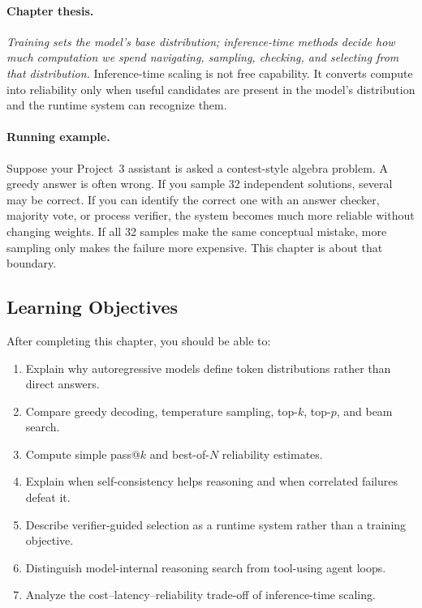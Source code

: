 \paragraph{Chapter thesis.} \emph{Training sets the model's base distribution; inference-time methods decide how much computation we spend navigating, sampling, checking, and selecting from that distribution.} Inference-time scaling is not free capability. It converts compute into reliability only when useful candidates are present in the model's distribution and the runtime system can recognize them.

\paragraph{Running example.} Suppose your Project~3 assistant is asked a contest-style algebra problem. A greedy answer is often wrong. If you sample 32 independent solutions, several may be correct. If you can identify the correct one with an answer checker, majority vote, or process verifier, the system becomes much more reliable without changing weights. If all 32 samples make the same conceptual mistake, more sampling only makes the failure more expensive. This chapter is about that boundary.

\subsection*{Learning Objectives}

After completing this chapter, you should be able to:

\begin{enumerate}
  \item Explain why autoregressive models define token distributions rather than direct answers.
  \item Compare greedy decoding, temperature sampling, top-$k$, top-$p$, and beam search.
  \item Compute simple pass@$k$ and best-of-$N$ reliability estimates.
  \item Explain when self-consistency helps reasoning and when correlated failures defeat it.
  \item Describe verifier-guided selection as a runtime system rather than a training objective.
  \item Distinguish model-internal reasoning search from tool-using agent loops.
  \item Analyze the cost--latency--reliability trade-off of inference-time scaling.
\end{enumerate}


